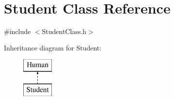 \hypertarget{class_student}{}\section{Student Class Reference}
\label{class_student}


{\ttfamily \#include $<$Student\+Class.\+h$>$}

Inheritance diagram for Student\+:\begin{figure}[H]
\begin{center}
\leavevmode
\includegraphics[height=2.000000cm]{class_student}
\end{center}
\end{figure}
